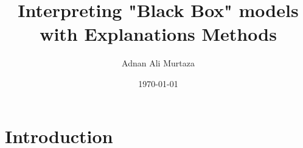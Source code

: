 \documentclass[english]{tktltiki2}
\title{Interpreting "Black Box" models with Explanations Methods}
\author{Adnan Ali Murtaza}
\date{\today}
\theoremstyle{definition}
\theoremstyle{remark}
\begin{document}

\frontmatter      %

\maketitle        %
\makeabstract     %

\tableofcontents  %

\mainmatter       %
\section{Introduction} %
\end{document}
